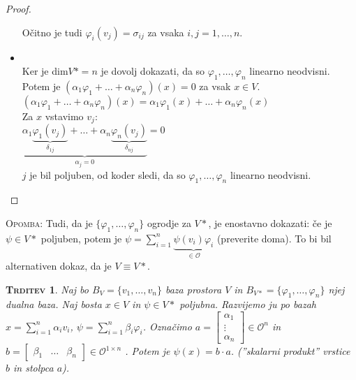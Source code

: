 \documentclass[a4paper,12pt]{article}
\newcommand{\OO}{\mathcal{O}}
\newtheorem*{trditev}{\textsc{Trditev}}
\begin{document}
\begin{proof}
\begin{itemize}
		Očitno je tudi $\varphi_i(v_j)=\sigma_{ij}$ za vsaka $i,j=1,\ldots,n$. 
		\item {}\\
	
		Ker je dim$V*=n$ je dovolj dokazati, da so $\varphi_1,\ldots,\varphi_n$ linearno neodvisni. \\

		Potem je $(\alpha_1\varphi_1+\ldots+\alpha_n\varphi_n)(x)=0$ za vsak $x\in V$. \\

		$(\alpha_1\varphi_1+\ldots+\alpha_n\varphi_n)(x)=\alpha_1\varphi_1(x)+\ldots+\alpha_n\varphi_n(x)$ \\

		Za $x$ vstavimo $v_j$: \\

		$\underbrace{\alpha_1\underbrace{\varphi_1(v_j)}_{\delta_{1j}}+\ldots+\alpha_n\underbrace{\varphi_n(v_j)}_{\delta_{nj}}}_{\alpha_j=0}=0$ \\

		$j$ je bil poljuben, od koder sledi, da so $\varphi_1,\ldots,\varphi_n$ linearno neodvisni. \\
	\end{itemize}
\end{proof}

\textsc{Opomba}: Tudi, da je $\{\varphi_1,\ldots,\varphi_n\}$ ogrodje za $V*$, je enostavno dokazati: če je $\psi \in V*$ poljuben, potem je $\psi =\sum_{i=1}^n \underbrace{\psi(v_i)\varphi_i}_{\in \OO}$ (preverite doma). To bi bil alternativen dokaz, da je $V\equiv V*$. 

\newpage 

\begin{trditev}
Naj bo $B_V=\{v_1,\ldots,v_n\}$ baza prostora $V$ in $B_{V*}=\{\varphi_1,\ldots,\varphi_n\}$ njej dualna baza. Naj bosta $x\in V$ in $\psi \in V*$ poljubna. Razvijemo ju po bazah $x=\sum_{i=1}^n\alpha_iv_i$, $\psi=\sum_{i=1}^n \beta_i\varphi_i$. Označimo $a=\begin{bmatrix} \alpha_1 \\ \vdots \\ \alpha_n \end{bmatrix} \in \OO^n$ in $b=\begin{bmatrix} \beta_1 & \ldots & \beta_n 
\end{bmatrix} \in \OO^{1\times n}$ . Potem je $\psi(x)=b\cdot a$. (''skalarni produkt'' vrstice $b$ in stolpca $a$). \\
\end{trditev}
\end{document}
